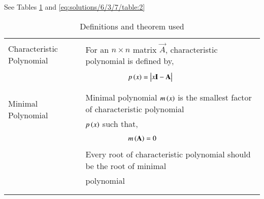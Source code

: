 See Tables     \ref{eq:solutions/6/3/7/table:1}
 and     \ref{eq:solutions/6/3/7/table:2}

\onecolumn
\begin{longtable}{|l|l|}
	\hline
	\multirow{3}{*}{Characteristic Polynomial} 
	& \\
	& For an $n\times n$ matrix $\vec{A}$, characteristic polynomial is defined by,\\
	&\\
	& $\qquad\qquad\qquad p\brak{x}=\mydet{x\Vec{I}-\Vec{A}}$\\
	&\\
	\hline
	\multirow{3}{*}{Minimal Polynomial} 
	&\\
	& Minimal polynomial $m\left(x\right)$ is the smallest factor of characteristic polynomial\\
	& $p\left(x\right)$ such that,\\
	&\\
	& $\qquad \qquad \qquad m\left(\mathbf{A}\right)=0$\\
	& \\
	& Every root of characteristic polynomial should be the root of minimal\\
	& polynomial\\
	&\\
    \hline
    \caption{Definitions and theorem used}
    \label{eq:solutions/6/3/7/table:1}
\end{longtable}
